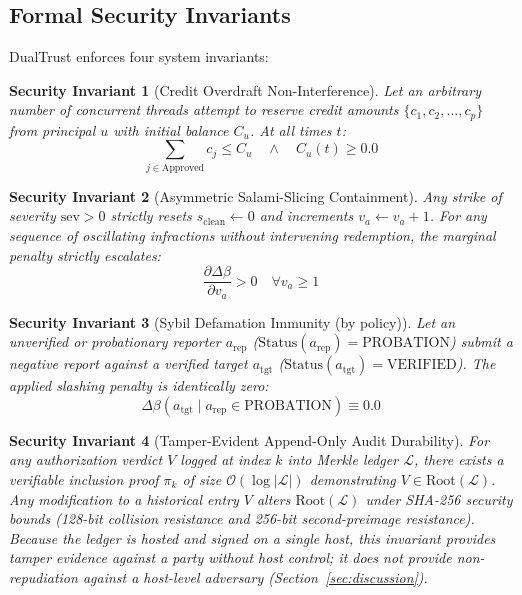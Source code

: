 \documentclass[journal]{IEEEtran}
\newtheorem{invariant}{Security Invariant}
\begin{document}
\subsection{Formal Security Invariants}
DualTrust enforces four system invariants:

\begin{invariant}[Credit Overdraft Non-Interference]
\label{inv:credit}
Let an arbitrary number of concurrent threads attempt to reserve credit amounts $\{c_1, c_2, \dots, c_p\}$ from principal $u$ with initial balance $C_u$. At all times $t$:
\begin{equation}
\sum_{j \in \text{Approved}} c_j \le C_u \quad \land \quad C_u(t) \ge 0.0
\end{equation}
\end{invariant}

\begin{invariant}[Asymmetric Salami-Slicing Containment]
\label{inv:salami}
Any strike of severity $\text{sev} > 0$ strictly resets $s_{\text{clean}} \leftarrow 0$ and increments $v_a \leftarrow v_a + 1$. For any sequence of oscillating infractions without intervening redemption, the marginal penalty strictly escalates:
\begin{equation}
\frac{\partial \Delta\beta}{\partial v_a} > 0 \quad \forall v_a \ge 1
\end{equation}
\end{invariant}

\begin{invariant}[Sybil Defamation Immunity (by policy)]
\label{inv:sybil}
Let an unverified or probationary reporter $a_{\text{rep}}$ ($\text{Status}(a_{\text{rep}}) = \text{PROBATION}$) submit a negative report against a verified target $a_{\text{tgt}}$ ($\text{Status}(a_{\text{tgt}}) = \text{VERIFIED}$). The applied slashing penalty is identically zero:
\begin{equation}
\Delta\beta(a_{\text{tgt}} \mid a_{\text{rep}} \in \text{PROBATION}) \equiv 0.0
\end{equation}
\end{invariant}

\begin{invariant}[Tamper-Evident Append-Only Audit Durability]
\label{inv:audit}
For any authorization verdict $V$ logged at index $k$ into Merkle ledger $\mathcal{L}$, there exists a verifiable inclusion proof $\pi_k$ of size $\mathcal{O}(\log |\mathcal{L}|)$ demonstrating $V \in \text{Root}(\mathcal{L})$. Any modification to a historical entry $V$ alters $\text{Root}(\mathcal{L})$ under SHA-256 security bounds (128-bit collision resistance and 256-bit second-preimage resistance). Because the ledger is hosted and signed on a single host, this invariant provides tamper \emph{evidence} against a party without host control; it does not provide non-repudiation against a host-level adversary (Section~\ref{sec:discussion}).
\end{invariant}
\end{document}
